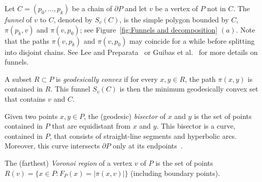 \documentclass[a4paper,UKenglish]{lipics}
\newcommand{\F}[2]{\ensuremath{F_{\scriptscriptstyle #1}(#2)}}
\newcommand{\fn}[2]{\ensuremath{S_{\scriptscriptstyle #1}(#2)}}
\newcommand{\g}[2]{\ensuremath{|\pi(#1, #2)|}}
\newcommand{\p}[2]{\ensuremath{\pi(#1, #2)}}
\begin{document}
Let $C = (p_0, \ldots, p_k)$ be a chain of $\partial P$ and let $v$ be a vertex of $P$ not in $C$.
The \emph{funnel} of $v$ to $C$, denoted by $\fn{v}{C}$, is the simple polygon bounded by $C$, $\p{p_k}{v}$ and $\p{v}{p_0}$; see Figure~\ref{fig:Funnels and decomposition} $(a)$. 
Note that the paths $\p{v}{p_k}$ and $\p{v}{p_0}$ may coincide for a while before splitting into disjoint chains. 
See Lee and Preparata~\cite{lee1984euclidean} or Guibas et al.~\cite{guibasShortestPathTree} for more details on funnels.

A subset $R\subset P$ is \emph{geodesically convex} if for every $x,y\in R$, the path $\p{x}{y}$ is contained in $R$.
This funnel $\fn{v}{C}$ is then the minimum geodesically convex set that contains $v$ and $C$.

Given two points $x,y\in P$, the (geodesic) \emph{bisector} of $x$ and $y$ is the set of points contained in $P$ that are equidistant from $x$ and $y$. This bisector is a curve, contained in $P$, that consists of straight-line segments and hyperbolic arcs. Moreover, this curve intersects $\partial P$ only at its endpoints~\cite[Lemma 3.22]{aronov1989geodesic}.

The (farthest) \emph{Voronoi region} of a vertex $v$ of $P$ is the set of points $R(v) = \{x\in P : \F{P}{x} = \g{x}{v}\}$ (including boundary points).
\end{document}
